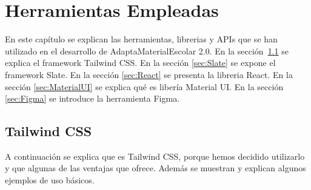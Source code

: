\chapter{Herramientas Empleadas}\label{ch:herramientas}

En este capítulo se explican las herramientas, librerias y APIs que se han utilizado en el desarrollo de AdaptaMaterialEscolar 2.0. En la sección~\ref{sec:tailwind} se explica el framework Tailwind CSS. En la sección \ref{sec:Slate} se expone el framework Slate. En la sección \ref{sec:React} se presenta la libreria React. En la sección \ref{sec:MaterialUI} se explica qué es libería Material UI. En la sección \ref{sec:Figma} se introduce la herramienta Figma.

\section{Tailwind CSS}\label{sec:tailwind}
A continuación se explica que es Tailwind CSS, porque hemos decidido utilizarlo y que algunas de las ventajas que ofrece. Además se muestran y explican algunos ejemplos de uso básicos.

